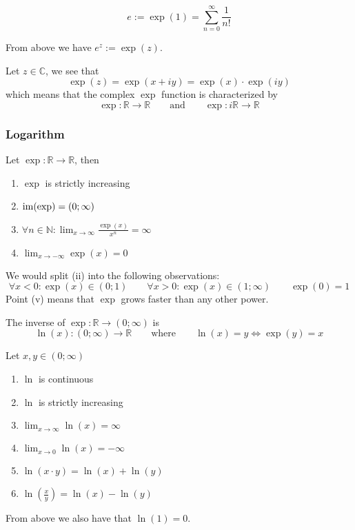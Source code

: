 \begin{definition}
   \[e := \exp(1) = \sum_{n=0}^\infty \frac{1}{n!}\]
\end{definition}
\begin{remark}[Notation]
   From above we have \(e^z := \exp(z)\).
\end{remark}

Let \(z \in \mathbb{C}\), we see that
\[\exp(z) = \exp(x + iy) = \exp(x) \cdot \exp(iy)\]
which means that the complex \(\exp\) function is characterized by
\[\exp: \mathbb{R} \to \mathbb{R} \qquad\text{and}\qquad \exp: i\mathbb{R} \to \mathbb{R}\]

\subsubsection{Logarithm}
\begin{proposition}
   Let \(\exp: \mathbb{R} \to \mathbb{R}\), then
   \begin{enumerate}[label=\roman*, align=Center]
      \item \(\exp\) is strictly increasing
      \item \(\operatorname{im}(\exp) = (0; \infty)\)
      \item \(\forall n \in \mathbb{N}: \lim_{x \to \infty} \frac{\exp(x)}{x^n} = \infty\)
      \item \(\lim_{x \to -\infty} \exp(x) = 0\)
   \end{enumerate}
\end{proposition}
\begin{remark}[Intuition]
   We would split (ii) into the following observations:
   \[\forall x < 0: \exp(x) \in (0; 1) \qquad \forall x > 0: \exp(x) \in (1; \infty) \qquad \exp(0) = 1\]
   Point (v) means that \(\exp\) grows faster than any other power.
\end{remark}

\begin{definition}[Logarithm]
   The inverse of \(\exp: \mathbb{R} \to (0; \infty)\) is
   \[\ln(x): (0; \infty) \to \mathbb{R} \qquad\text{where}\qquad \ln(x) = y \iff \exp(y) = x\]
\end{definition}

\begin{proposition}[Properties]
   Let \(x, y \in (0; \infty)\)
   \begin{enumerate}[label=\roman*, align=Center]
      \item \(\ln\) is continuous
      \item \(\ln\) is strictly increasing
      \item \(\lim_{x \to \infty} \ln(x) = \infty\)
      \item \(\lim_{x \to 0} \ln(x) = -\infty\)
      \item \(\ln(x \cdot y) = \ln(x) + \ln(y)\)
      \item \(\ln\left(\frac{x}{y}\right) = \ln(x) - \ln(y)\)
   \end{enumerate}
\end{proposition}
\begin{remark}
   From above we also have that \(\ln(1) = 0\).
\end{remark}

